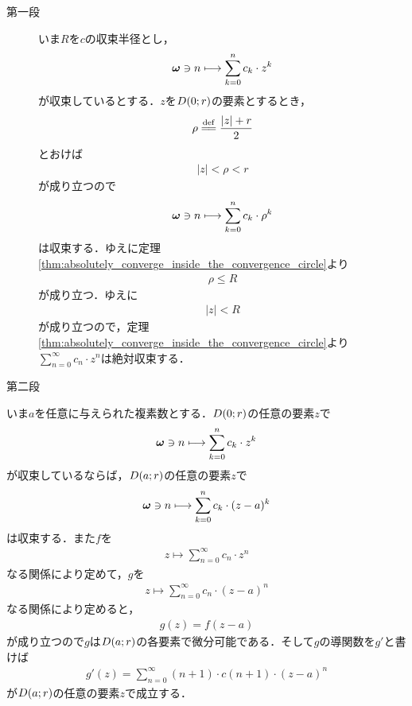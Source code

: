 	\begin{sketch}\mbox{}
		\begin{description}
			\item[第一段]
				いま$R$を$c$の収束半径とし，
				\begin{align}
					{\boldsymbol \omega} \ni n \longmapsto \sum_{k=0}^{n} c_{k} \cdot z^{k}
				\end{align}
				が収束しているとする．$z$を$D(0;r)$の要素とするとき，
				\begin{align}
					\rho \defeq \frac{|z| + r}{2}
				\end{align}
				とおけば
				\begin{align}
					|z| < \rho < r
				\end{align}
				が成り立つので
				\begin{align}
					{\boldsymbol \omega} \ni n \longmapsto \sum_{k=0}^{n} c_{k} \cdot \rho^{k}
				\end{align}
				は収束する．ゆえに定理\ref{thm:absolutely_converge_inside_the_convergence_circle}より
				\begin{align}
					\rho \leq R
				\end{align}
				が成り立つ．ゆえに
				\begin{align}
					|z| < R
				\end{align}
				が成り立つので，定理\ref{thm:absolutely_converge_inside_the_convergence_circle}より
				$\sum_{n=0}^{\infty} c_{n} \cdot z^{n}$は絶対収束する．
			
			\item[第二段]
				\QED
		\end{description}
	\end{sketch}
	
	いま$a$を任意に与えられた複素数とする．$D(0;r)$の任意の要素$z$で
	\begin{align}
		{\boldsymbol \omega} \ni n \longmapsto \sum_{k=0}^{n} c_{k} \cdot z^{k}
	\end{align}
	が収束しているならば，$D(a;r)$の任意の要素$z$で
	\begin{align}
		{\boldsymbol \omega} \ni n \longmapsto \sum_{k=0}^{n} c_{k} \cdot (z-a)^{k}
	\end{align}
	は収束する．また$f$を
	\begin{align}
		z \longmapsto \sum_{n=0}^{\infty} c_{n} \cdot z^{n}
	\end{align}
	なる関係により定めて，$g$を
	\begin{align}
		z \longmapsto \sum_{n=0}^{\infty} c_{n} \cdot (z-a)^{n}
	\end{align}
	なる関係により定めると，
	\begin{align}
		g(z) = f(z-a)
	\end{align}
	が成り立つので$g$は$D(a;r)$の各要素で微分可能である．そして$g$の導関数を$g'$と書けば
	\begin{align}
		g'(z) = \sum_{n=0}^{\infty} (n+1) \cdot c(n+1) \cdot (z-a)^{n}
	\end{align}
	が$D(a;r)$の任意の要素$z$で成立する．